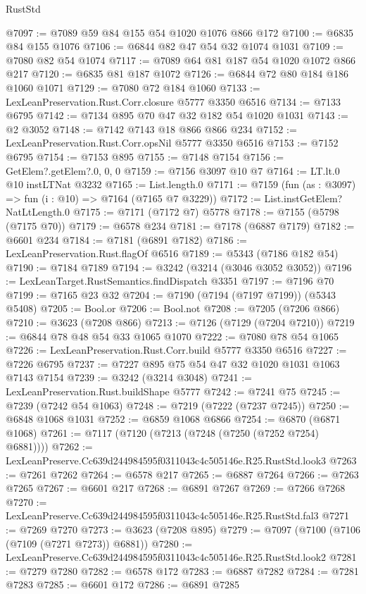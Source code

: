 \begin{lexlean}{RustStd}
\begin{coremodule}
@7097 := @7089 @59 @84 @155 @54 @1020 @1076 @866 @172
@7100 := @6835 @84 @155 @1076
@7106 := @6844 @82 @47 @54 @32 @1074 @1031
@7109 := @7080 @82 @54 @1074
@7117 := @7089 @64 @81 @187 @54 @1020 @1072 @866 @217
@7120 := @6835 @81 @187 @1072
@7126 := @6844 @72 @80 @184 @186 @1060 @1071
@7129 := @7080 @72 @184 @1060
@7133 := LexLeanPreservation.Rust.Corr.closure @5777 @3350 @6516
@7134 := @7133 @6795
@7142 := @7134 @895 @70 @47 @32 @182 @54 @1020 @1031
@7143 := @2 @3052
@7148 := @7142 @7143 @18 @866 @866 @234
@7152 := LexLeanPreservation.Rust.Corr.opsNil @5777 @3350 @6516
@7153 := @7152 @6795
@7154 := @7153 @895
@7155 := @7148 @7154
@7156 := GetElem?.getElem?.{0, 0, 0}
@7159 := @7156 @3097 @10 @7
@7164 := LT.lt.{0} @10 instLTNat @3232
@7165 := List.length.{0}
@7171 := @7159 (fun (as : @3097) => fun (i : @10) => @7164 (@7165 @7 @3229))
@7172 := List.instGetElem?NatLtLength.{0}
@7175 := @7171 (@7172 @7) @5778
@7178 := @7155 (@5798 (@7175 @70))
@7179 := @6578 @234
@7181 := @7178 (@6887 @7179)
@7182 := @6601 @234
@7184 := @7181 (@6891 @7182)
@7186 := LexLeanPreservation.Rust.flagOf @6516
@7189 := @5343 (@7186 @182 @54)
@7190 := @7184 @7189
@7194 := @3242 (@3214 (@3046 @3052 @3052))
@7196 := LexLeanTarget.RustSemantics.findDispatch @3351
@7197 := @7196 @70
@7199 := @7165 @23 @32
@7204 := @7190 (@7194 (@7197 @7199)) (@5343 @5408)
@7205 := Bool.or
@7206 := Bool.not
@7208 := @7205 (@7206 @866)
@7210 := @3623 (@7208 @866)
@7213 := @7126 (@7129 (@7204 @7210))
@7219 := @6844 @78 @48 @54 @33 @1065 @1070
@7222 := @7080 @78 @54 @1065
@7226 := LexLeanPreservation.Rust.Corr.build @5777 @3350 @6516
@7227 := @7226 @6795
@7237 := @7227 @895 @75 @54 @47 @32 @1020 @1031 @1063 @7143 @7154
@7239 := @3242 (@3214 @3048)
@7241 := LexLeanPreservation.Rust.buildShape @5777
@7242 := @7241 @75
@7245 := @7239 (@7242 @54 @1063)
@7248 := @7219 (@7222 (@7237 @7245))
@7250 := @6848 @1068 @1031
@7252 := @6859 @1068 @6866
@7254 := @6870 (@6871 @1068)
@7261 := @7117 (@7120 (@7213 (@7248 (@7250 (@7252 @7254) @6881))))
@7262 := LexLeanPreserve.Cc639d244984595f0311043c4c505146e.R25.RustStd.look3
@7263 := @7261 @7262
@7264 := @6578 @217
@7265 := @6887 @7264
@7266 := @7263 @7265
@7267 := @6601 @217
@7268 := @6891 @7267
@7269 := @7266 @7268
@7270 := LexLeanPreserve.Cc639d244984595f0311043c4c505146e.R25.RustStd.fal3
@7271 := @7269 @7270
@7273 := @3623 (@7208 @895)
@7279 := @7097 (@7100 (@7106 (@7109 (@7271 @7273)) @6881))
@7280 := LexLeanPreserve.Cc639d244984595f0311043c4c505146e.R25.RustStd.look2
@7281 := @7279 @7280
@7282 := @6578 @172
@7283 := @6887 @7282
@7284 := @7281 @7283
@7285 := @6601 @172
@7286 := @6891 @7285

\end{coremodule}
\end{lexlean}

